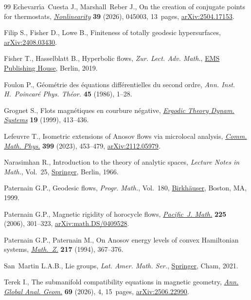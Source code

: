 \begin{thebibliography}{99}
Echevarr\'{\i}a~Cuesta J., Marshall~Reber J., On the creation of conjugate
 points for thermostats,
 \href{https://doi.org/10.1088/1361-6544/ae5569}{\textit{Nonlinearity}}
 \textbf{39} (2026), 045003, 13~pages,
 \href{http://arxiv.org/abs/2504.17153}{arXiv:2504.17153}.

Filip S., Fisher D., Lowe B., Finiteness of totally geodesic hypersurfaces,
 \href{http://arxiv.org/abs/2408.03430}{arXiv:2408.03430}.

Fisher T., Hasselblatt B., Hyperbolic flows, \textit{Zur. Lect. Adv. Math.},
 \href{https://doi.org/10.4171/200}{EMS Publishing House}, Berlin, 2019.

Foulon P., G\'{e}om\'{e}trie des \'{e}quations diff\'{e}rentielles du second
 ordre, \textit{Ann. Inst. H.~Poincar\'{e} Phys. Th\'{e}or.} \textbf{45}
 (1986), 1--28.

Grognet S., Flots magn\'{e}tiques en courbure n\'{e}gative,
 \href{https://doi.org/10.1017/S0143385799126634}{\textit{Ergodic Theory
 Dynam. Systems}} \textbf{19} (1999), 413--436.

Lefeuvre T., Isometric extensions of {A}nosov flows via microlocal analysis,
 \href{https://doi.org/10.1007/s00220-022-04561-0}{\textit{Comm. Math. Phys.}}
 \textbf{399} (2023), 453--479,
 \href{http://arxiv.org/abs/2112.05979}{arXiv:2112.05979}.

Narasimhan R., Introduction to the theory of analytic spaces, \textit{Lecture
 Notes in Math.}, Vol.~25, \href{https://doi.org/10.1007/BFb0077071}{Springer}, Berlin, 1966.

Paternain G.P., Geodesic flows, \textit{Progr. Math.}, Vol.~180,
 \href{https://doi.org/10.1007/978-1-4612-1600-1}{Birkh\"{a}user}, Boston, MA,
 1999.

Paternain G.P., Magnetic rigidity of horocycle flows,
 \href{https://doi.org/10.2140/pjm.2006.225.301}{\textit{Pacific~J. Math.}}
 \textbf{225} (2006), 301--323,
 \href{http://arxiv.org/abs/math.DS/0409528}{arXiv:math.DS/0409528}.

Paternain G.P., Paternain M., On {A}nosov energy levels of convex {H}amiltonian
 systems, \href{https://doi.org/10.1007/BF02571949}{\textit{Math.~Z.}}
 \textbf{217} (1994), 367--376.

San~Martin L.A.B., Lie groups, \textit{Lat. Amer. Math. Ser.},
 \href{https://doi.org/10.1007/978-3-030-61824-7}{Springer}, Cham, 2021.

Terek I., The submanifold compatibility equations in magnetic geometry,
 \href{https://doi.org/10.1007/s10455-026-10026-7}{\textit{Ann. Global Anal.
 Geom.}} \textbf{69} (2026), 4, 15~pages,
 \href{http://arxiv.org/abs/2506.22990}{arXiv:2506.22990}.

\end{thebibliography}
